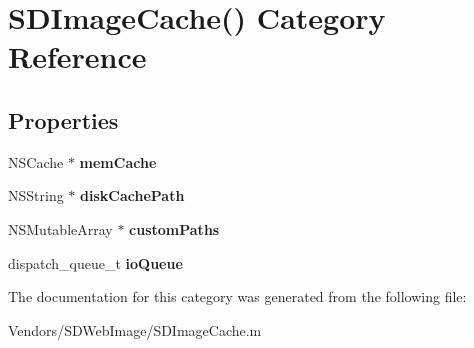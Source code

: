 \hypertarget{category_s_d_image_cache_07_08}{}\section{S\+D\+Image\+Cache() Category Reference}
\label{category_s_d_image_cache_07_08}
\subsection*{Properties}
\begin{DoxyCompactItemize}
\item 
\hypertarget{category_s_d_image_cache_07_08_a92cbea5e90d14300f1eaeea352f3cd7d}{}N\+S\+Cache $\ast$ {\bfseries mem\+Cache}\label{category_s_d_image_cache_07_08_a92cbea5e90d14300f1eaeea352f3cd7d}

\item 
\hypertarget{category_s_d_image_cache_07_08_a02cb42a09ea25a55f3dd90fae45ff940}{}N\+S\+String $\ast$ {\bfseries disk\+Cache\+Path}\label{category_s_d_image_cache_07_08_a02cb42a09ea25a55f3dd90fae45ff940}

\item 
\hypertarget{category_s_d_image_cache_07_08_a00aa52acc3e69fd53f1ab1b713907525}{}N\+S\+Mutable\+Array $\ast$ {\bfseries custom\+Paths}\label{category_s_d_image_cache_07_08_a00aa52acc3e69fd53f1ab1b713907525}

\item 
\hypertarget{category_s_d_image_cache_07_08_a03fcaa98908cd1f3fcc7a6b09be6c028}{}dispatch\+\_\+queue\+\_\+t {\bfseries io\+Queue}\label{category_s_d_image_cache_07_08_a03fcaa98908cd1f3fcc7a6b09be6c028}

\end{DoxyCompactItemize}


The documentation for this category was generated from the following file\+:\begin{DoxyCompactItemize}
\item 
Vendors/\+S\+D\+Web\+Image/S\+D\+Image\+Cache.\+m\end{DoxyCompactItemize}
